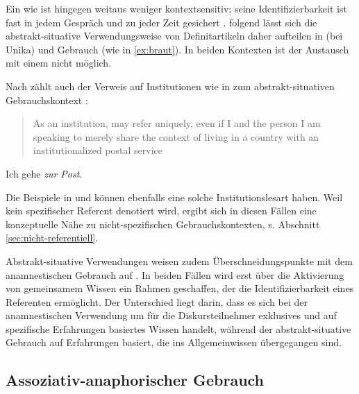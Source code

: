 Ein  wie  ist hingegen weitaus weniger kontextsensitiv; seine Identifizierbarkeit ist fast in jedem Gespräch und zu jeder Zeit gesichert \parencite[549]{Schroeder2006}. \textcite[40--41]{Studler2011} folgend lässt sich die abstrakt-situative  Verwendungsweise von Definitartikeln  daher aufteilen in  (bei Unika)  und  Gebrauch (wie in \ref{ex:braut}). In beiden Kontexten ist der Austausch mit einem  nicht möglich. 

Nach \citeauthor{Schroeder2006} zählt auch der Verweis auf Institutionen wie in  zum abs\-trakt-situativen  Gebrauchskontext \parencite[vgl. auch][110]{Nubling2005}:  \blockcquote[549]{Schroeder2006}{As an institution,  may refer uniquely, even if I and the person I am speaking to merely share the context of living in a country with an institutionalized postal service}. 

\begin{exe}
	\ex \label{ex:post} Ich gehe \textit{zur Post}.
\end{exe}

\noindent
Die Beispiele in  und  können ebenfalls eine solche Institutionslesart haben. Weil kein spezifischer Referent denotiert wird, ergibt sich in diesen Fällen eine konzeptuelle Nähe zu nicht-spezifischen 
 Gebrauchskontexten, s. Abschnitt \ref{sec:nicht-referentiell}.

Abstrakt-situative  Verwendungen weisen zudem Überschneidungspunkte mit dem anamnestischen  Gebrauch auf \parencite[62]{Himmelmann1997}. In beiden Fällen wird erst über die Aktivierung von gemeinsamem Wissen ein Rahmen geschaffen, der die Identifizierbarkeit eines Referenten ermöglicht. Der Unterschied liegt darin, dass es sich bei der anamnestischen  Verwendung um für die Diskursteilnehmer exklusives und auf spezifische Erfahrungen basiertes Wissen handelt, während der abstrakt-situative  Gebrauch auf Erfahrungen basiert, die ins Allgemeinwissen übergegangen sind. 

\subsection{Assoziativ-anaphorischer Gebrauch}\label{sec:asso}

